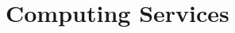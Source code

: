 \documentclass{dune} %
\begin{document}
\pagestyle{titlepage}
%
\cleardoublepage


\cleardoublepage

% 

% 




% 

% 



% 

% 

% 

% 
% 
% 


% 

% 

% 

% 

% 

\part{Computing Services} %


\cleardoublepage
\end{document}
